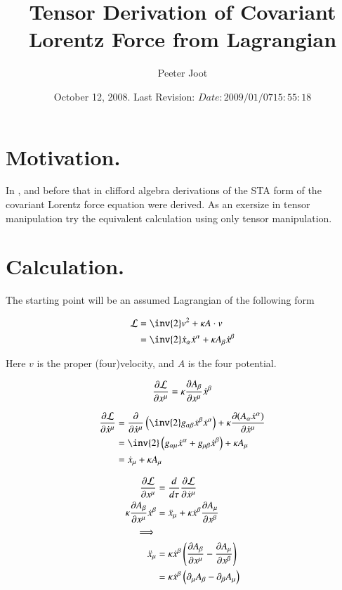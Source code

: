 \documentclass{article}
\title{Tensor Derivation of Covariant Lorentz Force from Lagrangian}
\author{Peeter Joot}
\date{ October 12, 2008.  Last Revision: $Date: 2009/01/07 15:55:18 $ }
\begin{document}
\maketitle{}

\tableofcontents

\section{ Motivation. }

In \cite{PJSrLorentzForce}, and before that in \cite{PJSrLagrangian} clifford
algebra derivations of the STA form of the covariant Lorentz force equation
were derived.  As an exersize in tensor manipulation try the equivalent
calculation using only tensor manipulation.

\section{ Calculation. }

The starting point will be an assumed Lagrangian of the following form

\begin{align}\label{eqn:lagrangian}
\LL &= \inv{2} v^2 + \kappa A \cdot v \\
&= \inv{2} \xdot_\alpha \xdot^\alpha + \kappa A_\beta \xdot^\beta
\end{align}

Here $v$ is the proper (four)velocity, and $A$ is the four potential.

\begin{align*}
\PD{x^\mu}{\LL} = \kappa \PD{x^\mu}{A_\beta} \xdot^\beta
\end{align*}

\begin{align*}
\PD{\xdot^\mu}{\LL}
&= \PD{\xdot^\mu}{} \left( \inv{2} g_{\alpha\beta} \xdot^\beta \xdot^\alpha \right) + \kappa \PD{\xdot^\mu}{(A_\alpha \xdot^\alpha)} \\
&= \inv{2} \left( g_{\alpha\mu} \xdot^\alpha +g_{\mu\beta} \xdot^\beta \right) + \kappa A_\mu \\
&= \xdot_\mu + \kappa A_\mu \\
\end{align*}

\begin{align*}
\PD{x^\mu}{\LL} &= \frac{d}{d\tau} \PD{\xdot^\mu}{\LL} \\
\kappa \PD{x^\mu}{A_\beta} \xdot^\beta &= \xddot_\mu + \kappa \xdot^\beta \PD{x^\beta}{A_\mu} \\
\implies \\
\xddot_\mu
&= \kappa \xdot^\beta \left( \PD{x^\mu}{A_\beta} - \PD{x^\beta}{A_\mu} \right) \\
&= \kappa \xdot^\beta \left( \partial_\mu {A_\beta} - \partial_{\beta}{A_\mu} \right) \\
\end{align*}
\end{document}
